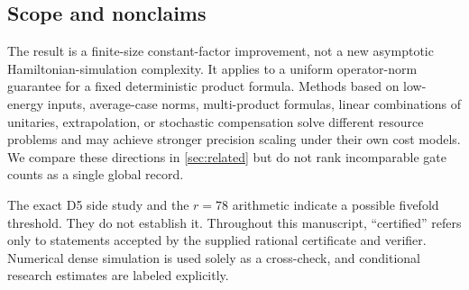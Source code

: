 \subsection{Scope and nonclaims}

The result is a finite-size constant-factor improvement, not a new asymptotic
Hamiltonian-simulation complexity.  It applies to a uniform operator-norm
guarantee for a fixed deterministic product formula.  Methods based on low-
energy inputs, average-case norms, multi-product formulas, linear combinations
of unitaries, extrapolation, or stochastic compensation solve different
resource problems and may achieve stronger precision scaling under their own
cost models.  We compare these directions in \cref{sec:related} but do not
rank incomparable gate counts as a single global record.

The exact D5 side study and the $r=78$ arithmetic indicate a possible
fivefold threshold.  They do not establish it.  Throughout this manuscript,
``certified'' refers only to statements accepted by the supplied rational
certificate and verifier.  Numerical dense simulation is used solely as a
cross-check, and conditional research estimates are labeled explicitly.
